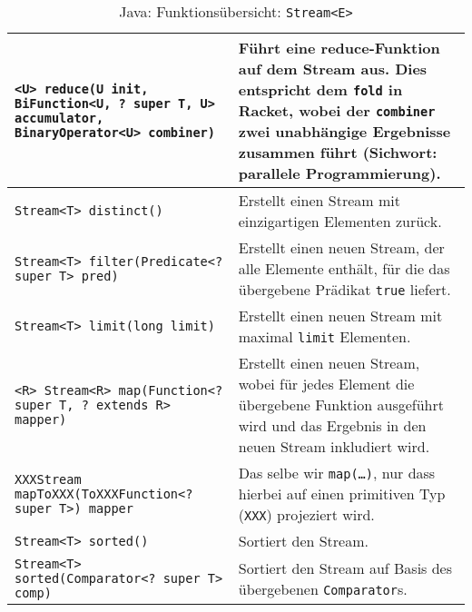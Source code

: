 \documentclass[a4paper, 11pt, accentcolor = tud3b]{tudreport}
\begin{document}
\begin{sidewaystable}
\begin{tabular}{p{8cm} | p{13cm}}
                        \texttt{<U> reduce(U init, BiFunction<U, ? super T, U> accumulator, BinaryOperator<U> combiner)} & Führt eine reduce-Funktion auf dem Stream aus. Dies entspricht dem \texttt{fold} in Racket, wobei der \texttt{combiner} zwei unabhängige Ergebnisse zusammen führt (Sichwort: parallele Programmierung). \\
                        \hline
                        \texttt{Stream<T> distinct()} & Erstellt einen Stream mit einzigartigen Elementen zurück. \\
                        \texttt{Stream<T> filter(Predicate<? super T> pred)} & Erstellt einen neuen Stream, der alle Elemente enthält, für die das übergebene Prädikat \texttt{true} liefert. \\
                        \texttt{Stream<T> limit(long limit)} & Erstellt einen neuen Stream mit maximal \texttt{limit} Elementen. \\
                        \texttt{<R> Stream<R> map(Function<? super T, ? extends R> mapper)} & Erstellt einen neuen Stream, wobei für jedes Element die übergebene Funktion ausgeführt wird und das Ergebnis in den neuen Stream inkludiert wird. \\
                        \texttt{XXXStream mapToXXX(ToXXXFunction<? super T>) mapper} & Das selbe wir \texttt{map(\dots)}, nur dass hierbei auf einen primitiven Typ (\texttt{XXX}) projeziert wird. \\
                        \texttt{Stream<T> sorted()} & Sortiert den Stream. \\
                        \texttt{Stream<T> sorted(Comparator<? super T> comp)} & Sortiert den Stream auf Basis des übergebenen \texttt{Comparator}s. \\
                    \end{tabular}
                    \caption{Java: Funktionsübersicht: \texttt{Stream<E>}}
                \end{sidewaystable}
\end{document}
